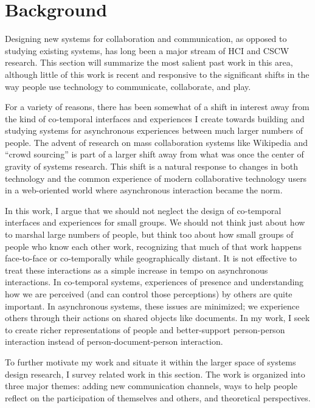 \documentclass{tufte-handout}
\begin{document}
\section{Background}

Designing new systems for collaboration and communication, as opposed to studying existing systems, has long been a major stream of HCI and CSCW research. This section will summarize the most salient past work in this area, although little of this work is recent and responsive to the significant shifts in the way people use technology to communicate, collaborate, and play. 

For a variety of reasons, there has been somewhat of a shift in interest away from the kind of co-temporal interfaces and experiences I create towards building and studying systems for asynchronous experiences between much larger numbers of people. The advent of research on mass collaboration systems like Wikipedia \citet{kittur} and ``crowd sourcing'' \citet{bernstein} is part of a larger shift away from what was once the center of gravity of systems research. This shift is a natural response to changes in both technology and the common experience of modern collaborative technology users in a web-oriented world where asynchronous interaction became the norm.

In this work, I argue that we should not neglect the design of co-temporal interfaces and experiences for small groups. We should not think just about how to marshal large numbers of people, but think too about how small groups of people who know each other work, recognizing that much of that work happens face-to-face or co-temporally while geographically distant. It is not effective to treat these interactions as a simple increase in tempo on asynchronous interactions. In co-temporal systems, experiences of presence and understanding how we are perceived (and can control those perceptions) by others are quite important. In asynchronous systems, these issues are minimized; we experience others through their actions on shared objects like documents. In my work, I seek to create richer representations of people and better-support person-person interaction instead of person-document-person interaction. 

To further motivate my work and situate it within the larger space of systems design research, I survey related work in this section. The work is organized into three major themes: adding new communication channels, ways to help people reflect on the participation of themselves and others, and theoretical perspectives.
\end{document}
